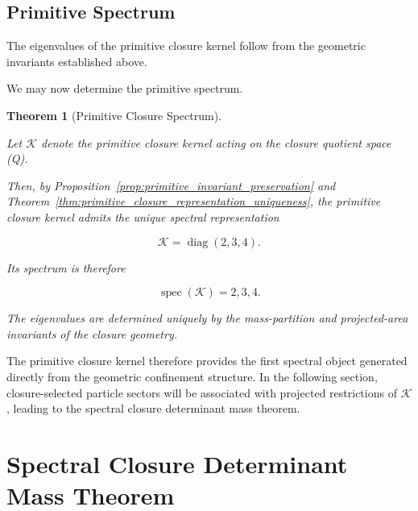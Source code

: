 \documentclass[11pt]{article}
\newtheorem{theorem}{Theorem}[section]
\theoremstyle{definition}
\theoremstyle{remark}
\begin{document}
\subsection{Primitive Spectrum}
\label{subsec:primitive_spectrum}

The eigenvalues of the primitive closure kernel follow
from the geometric invariants established above.

We may now determine the primitive spectrum.

\begin{theorem}[Primitive Closure Spectrum]
\label{thm:primitive_closure_spectrum}

Let \(\mathcal K\) denote the primitive closure kernel acting
on the closure quotient space (\mathcal Q).

Then, by
Proposition~\ref{prop:primitive_invariant_preservation}
and
Theorem~\ref{thm:primitive_closure_representation_uniqueness},
the primitive closure kernel admits the unique spectral
representation

\begin{equation}
\mathcal K =
\operatorname{diag}(2,3,4).
\label{eq:primitive_kernel_final}
\end{equation}

Its spectrum is therefore

\begin{equation}
\operatorname{spec}(\mathcal K) = {2,3,4}.
\label{eq:primitive_spectrum}
\end{equation}

The eigenvalues are determined uniquely by the
mass-partition and projected-area invariants of the closure
geometry.

\end{theorem}

The primitive closure kernel therefore provides the first
spectral object generated directly from the geometric
confinement structure. In the following section,
closure-selected particle sectors will be associated with
projected restrictions of \(\mathcal K\), leading to the
spectral closure determinant mass theorem.


\section{Spectral Closure Determinant Mass Theorem}
\label{sec:spectral_closure_determinant_mass_theorem}
\end{document}
